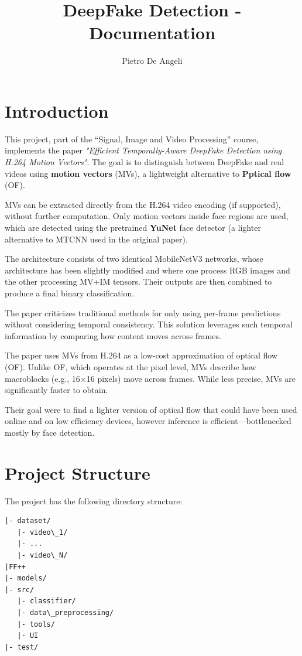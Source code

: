 \documentclass[a4paper,12pt]{article}
\title{DeepFake Detection - Documentation}
\author{Pietro De Angeli}
\begin{document}
\maketitle
\tableofcontents

\section{Introduction}

This project, part of the “Signal, Image and Video Processing” course, implements the paper \emph{"Efficient Temporally-Aware DeepFake Detection using H.264 Motion Vectors"}. The goal is to distinguish between DeepFake and real videos using \textbf{motion vectors} (MVs), a lightweight alternative to \textbf{Pptical flow} (OF).

MVs can be extracted directly from the H.264 video encoding (if supported), without further computation. Only motion vectors inside face regions are used, which are detected using the pretrained \textbf{YuNet} face detector (a lighter alternative to MTCNN used in the original paper).

The architecture consists of two identical MobileNetV3 networks, whose architecture has been slightly modified and where one process RGB images and the other processing MV+IM tensors. Their outputs are then combined to produce a final binary classification.

The paper criticizes traditional methods for only using per-frame predictions without considering temporal consistency. This solution leverages such temporal information by comparing how content moves across frames.

The paper uses MVs from H.264 as a low-cost approximation of optical flow (OF). Unlike OF, which operates at the pixel level, MVs describe how macroblocks (e.g., 16×16 pixels) move across frames. While less precise, MVs are significantly faster to obtain.

Their goal were to find a lighter version of optical flow that could have been used online and on low efficiency devices, however inference is efficient—bottlenecked mostly by face detection.

\section{Project Structure}

The project has the following directory structure:

\begin{verbatim}
|- dataset/
   |- video\_1/
   |- ...
   |- video\_N/
|FF++
|- models/
|- src/
   |- classifier/
   |- data\_preprocessing/
   |- tools/
   |- UI
|- test/
\end{verbatim}
\end{document}
